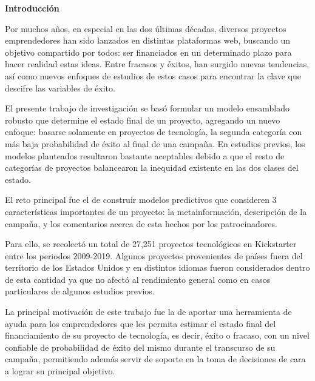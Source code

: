 \thispagestyle{plain}
\begin{center}
	{\Large \bfseries  Introducción}
\end{center}
\vspace{0.5cm}

Por muchos años, en especial en las dos últimas décadas, diversos proyectos emprendedores han sido lanzados en distintas plataformas web, buscando un objetivo compartido por todos: ser financiados en un determinado plazo para hacer realidad estas ideas. Entre fracasos y éxitos, han surgido nuevas tendencias, así como nuevos enfoques de estudios de estos casos para encontrar la clave que descifre las variables de éxito.

El presente trabajo de investigación se basó formular un modelo ensamblado robusto que determine el estado final de un proyecto, agregando un nuevo enfoque: basarse solamente en proyectos de tecnología, la segunda categoría con más baja probabilidad de éxito al final de una campaña. En estudios previos, los modelos planteados resultaron bastante aceptables debido a que el resto de categorías de proyectos balancearon la inequidad existente en las dos clases del estado.

El reto principal fue el de construir modelos predictivos que consideren 3 características importantes de un proyecto: la metainformación, descripción de la campaña, y los comentarios acerca de esta hechos por los patrocinadores.

Para ello, se recolectó un total de 27,251 proyectos tecnológicos en Kickstarter entre los periodos 2009-2019. Algunos proyectos provenientes de países fuera del territorio de los Estados Unidos y en distintos idiomas fueron considerados dentro de esta cantidad ya que no afectó al rendimiento general como en casos particulares de algunos estudios previos.

La principal motivación de este trabajo fue la de aportar una herramienta de ayuda para los emprendedores que les permita estimar el estado final del financiamiento de su proyecto de tecnología, es decir, éxito o fracaso, con un nivel confiable de probabilidad de éxito del mismo durante el transcurso de su campaña, permitiendo además servir de soporte en la toma de decisiones de cara a lograr su principal objetivo.
